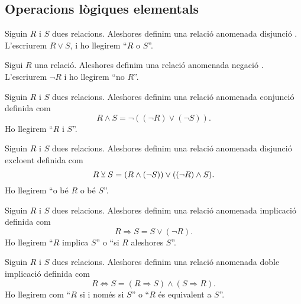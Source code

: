 \documentclass[../Apunts.tex]{subfiles}
\begin{document}
	\subsection{Operacions lògiques elementals}
	\begin{definition}[Disjunció]
		\label{def:disjunció}
		Siguin \(R\) i \(S\) dues relacions. Aleshores definim una relació anomenada disjunció%
		. L'escriurem \(R\lor S\), i ho llegirem ``\(R\) o \(S\)''.
	\end{definition}
	\begin{definition}[Negació]
		\label{def:negació}
		Sigui \(R\) una relació. Aleshores definim una relació anomenada negació%
		. L'escriurem \(\lnot R\) i ho llegirem ``no \(R\)''.
	\end{definition}
	\begin{definition}[Conjunció]
		\label{def:conjunció}
		Siguin \(R\) i \(S\) dues relacions. Aleshores definim una relació anomenada conjunció definida com
		\[R\land S=\lnot((\lnot R)\lor(\lnot S)).\]
		Ho llegirem ``\(R\) i \(S\)''.
	\end{definition}
	\begin{definition}
		\label{def:disjunció excloent}
		Siguin \(R\) i \(S\) dues relacions. Aleshores definim una relació anomenada disjunció excloent definida com
		\[R\veebar S=(R\land(\lnot S))\lor((\lnot R)\land S).\]
		Ho llegirem ``o bé \(R\) o bé \(S\)''.
	\end{definition}
	\begin{definition}[Implicació]
		\label{def:implicació}
		Siguin \(R\) i \(S\) dues relacions. Aleshores definim una relació anomenada implicació definida com
		\[R\Rightarrow S=S\lor(\lnot R).\]
		Ho llegirem ``\(R\) implica \(S\)'' o ``si \(R\) aleshores \(S\)''.
	\end{definition}
	\begin{definition}
		\label{def:doble implicació}
		Siguin \(R\) i \(S\) dues relacions. Aleshores definim una relació anomenada doble implicació definida com
		\[R\Leftrightarrow S=(R\Rightarrow S)\land(S\Rightarrow R).\]
		Ho llegirem com ``\(R\) si i només si \(S\)'' o ``\(R\) és equivalent a \(S\)''.
	\end{definition}
\end{document}
